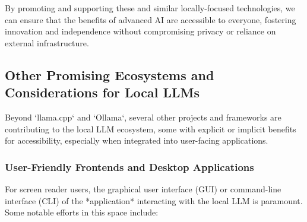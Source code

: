 By promoting and supporting these and similar locally-focused technologies, we can ensure that the benefits of advanced AI are accessible to everyone, fostering innovation and independence without compromising privacy or reliance on external infrastructure.
\subsection{Other Promising Ecosystems and Considerations for Local LLMs}

Beyond `llama.cpp` and `Ollama`, several other projects and frameworks are contributing to the local LLM ecosystem, some with explicit or implicit benefits for accessibility, especially when integrated into user-facing applications.

\subsubsection{User-Friendly Frontends and Desktop Applications}
For screen reader users, the graphical user interface (GUI) or command-line interface (CLI) of the *application* interacting with the local LLM is paramount. Some notable efforts in this space include:
